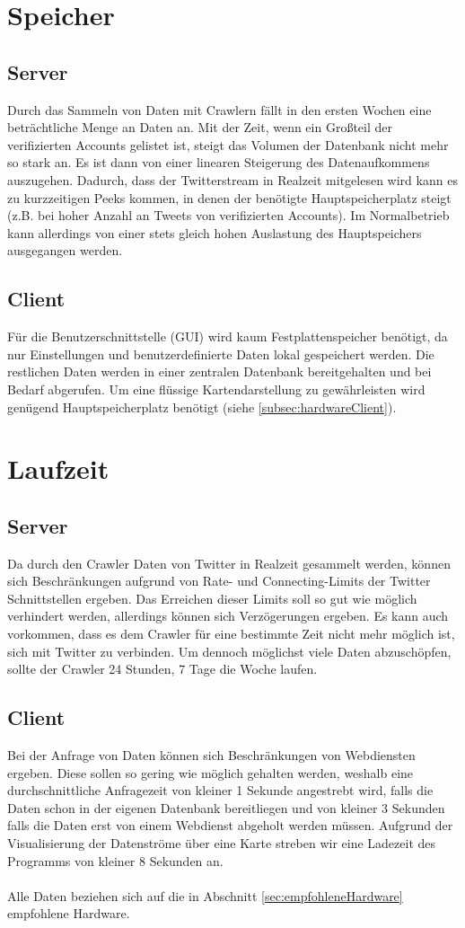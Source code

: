 \section{Speicher}
\subsection{Server}
Durch das Sammeln von Daten mit Crawlern fällt in den ersten Wochen eine beträchtliche Menge an Daten an. Mit der Zeit, wenn ein Großteil der verifizierten Accounts gelistet ist, steigt das Volumen der Datenbank nicht mehr so stark an. Es ist dann von einer linearen Steigerung des Datenaufkommens auszugehen. 
Dadurch, dass der Twitterstream in Realzeit mitgelesen wird kann es zu  kurzzeitigen Peeks kommen, in denen der benötigte Hauptspeicherplatz steigt (z.B. bei hoher Anzahl an Tweets von verifizierten Accounts). Im Normalbetrieb kann allerdings von einer stets gleich hohen Auslastung des Hauptspeichers ausgegangen werden.
\subsection{Client}
Für die Benutzerschnittstelle (GUI) wird kaum Festplattenspeicher benötigt, da nur Einstellungen und benutzerdefinierte Daten lokal gespeichert werden. Die restlichen Daten werden in einer zentralen Datenbank bereitgehalten und bei Bedarf abgerufen.
Um eine flüssige Kartendarstellung zu gewährleisten wird genügend Hauptspeicherplatz benötigt (siehe \ref{subsec:hardwareClient}).
\section{Laufzeit}
\subsection{Server}
Da durch den Crawler Daten von Twitter in Realzeit gesammelt werden, können sich Beschränkungen aufgrund von Rate- und Connecting-Limits der Twitter Schnittstellen ergeben. Das Erreichen dieser Limits soll so gut wie möglich verhindert werden, allerdings können sich Verzögerungen ergeben. Es kann auch vorkommen, dass es dem Crawler für eine bestimmte Zeit nicht mehr möglich ist, sich mit Twitter zu verbinden. Um dennoch möglichst viele Daten abzuschöpfen, sollte der Crawler 24 Stunden, 7 Tage die Woche laufen.
\subsection{Client}
Bei der Anfrage von Daten können sich Beschränkungen von Webdiensten ergeben. Diese sollen so gering wie möglich gehalten werden, weshalb eine durchschnittliche Anfragezeit von kleiner 1 Sekunde angestrebt wird, falls die Daten schon in der eigenen Datenbank bereitliegen und von kleiner 3 Sekunden falls die Daten erst von einem Webdienst abgeholt werden müssen.
Aufgrund der Visualisierung der Datenströme über eine Karte streben wir eine Ladezeit des Programms von kleiner 8 Sekunden an.\\\\
Alle Daten beziehen sich auf die in Abschnitt \ref{sec:empfohleneHardware} empfohlene Hardware.